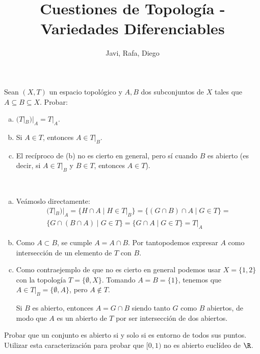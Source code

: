 \documentclass{article}
\begin{document}
\title{Cuestiones de Topología - Variedades Diferenciables}
\author{Javi, Rafa, Diego}
\maketitle

\begin{ejer}

Sean $(X,T)$ un espacio topológico y $A,B$ dos subconjuntos de $X$ tales que $A\subseteq B\subseteq X$. Probar:
\begin{enumerate}[(a)]
\item $(T|_B)|_A=T|_A$.
\item Si $A\in T$, entonces $A\in T|_B$.
\item El recíproco de (b) no es cierto en general, pero sí cuando $B$ es abierto (es decir, si $A\in T|_B$ y $B\in T$, entonces $A\in T$).
\end{enumerate}

\end{ejer}
\begin{sol}\
\begin{enumerate}[(a)]
\item Veámoslo directamente:
\begin{gather*}
(T|_B)|_A = \{H\cap A \mid H \in T|_B\} = \{(G\cap B)\cap A \mid G \in T\} = \\
\{G\cap(B\cap A)\mid G\in T\} = \{G\cap A \mid G \in T\} = T|_A
\end{gather*}
\item Como $A\subset B$, se cumple $A=A\cap B$. Por tantopodemos expresar $A$ como intersección de un elemento de $T$ con $B$.
\item Como contraejemplo de que no es cierto en general podemos usar $X=\{1,2\}$ con la topología $T=\{\emptyset,X\}$. Tomando $A=B=\{1\}$, tenemos que $A \in T|_B = \{\emptyset,A\}$, pero $A \notin T$.

Si $B$ es abierto, entonces $A=G\cap B$ siendo tanto $G$ como $B$ abiertos, de modo que $A$ es un abierto de $T$ por ser intersección de dos abiertos.
\end{enumerate}

\end{sol}
\newpage
\begin{ejer}\label{2}
Probar que un conjunto es abierto si y solo si es entorno de todos sus puntos. Utilizar esta caracterización para probar que $[0,1)$ no es abierto euclídeo de $\R$.
\end{ejer}
\end{document}
